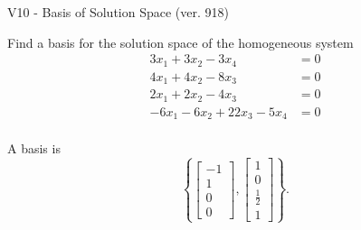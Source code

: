 \begin{exercise}
  \begin{exerciseTitle}V10 - Basis of Solution Space (ver. 918)\end{exerciseTitle}
  \begin{exerciseStatement}
    Find a basis for the solution space of the homogeneous system 
\begin{align*}
 3 x_ 1 + 3 x_ 2 -3 x_ 4 &= 0  \\ 
  4 x_ 1 + 4 x_ 2 -8 x_ 3 &= 0  \\ 
  2 x_ 1 + 2 x_ 2 -4 x_ 3 &= 0  \\ 
  -6 x_ 1 -6 x_ 2 + 22 x_ 3 -5 x_ 4 &= 0  \\ 
 \end{align*}


 
  \end{exerciseStatement}

  \begin{exerciseAnswer}
   A basis is   
\[\left\{\left[\begin{array}{c}
-1 \\
1 \\
0 \\
0
\end{array}\right] , \left[\begin{array}{c}
1 \\
0 \\
\frac{1}{2} \\
1
\end{array}\right]\right\}.\]

  


  \end{exerciseAnswer}
\end{exercise}